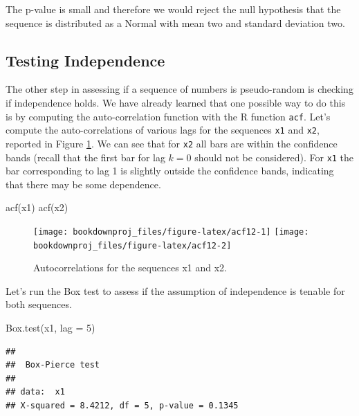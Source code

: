 \documentclass[
]{book}
\newenvironment{Shaded}{\begin{snugshade}}{\end{snugshade}}
\newcommand{\AttributeTok}[1]{\textcolor[rgb]{0.77,0.63,0.00}{#1}}
\newcommand{\DecValTok}[1]{\textcolor[rgb]{0.00,0.00,0.81}{#1}}
\newcommand{\FunctionTok}[1]{\textcolor[rgb]{0.00,0.00,0.00}{#1}}
\newcommand{\NormalTok}[1]{#1}
\begin{document}
The p-value is small and therefore we would reject the null hypothesis that the sequence is distributed as a Normal with mean two and standard deviation two.

\hypertarget{testing-independence-1}{%
\subsection{Testing Independence}\label{testing-independence-1}}

The other step in assessing if a sequence of numbers is pseudo-random is checking if independence holds. We have already learned that one possible way to do this is by computing the auto-correlation function with the R function \texttt{acf}. Let's compute the auto-correlations of various lags for the sequences \texttt{x1} and \texttt{x2}, reported in Figure \ref{fig:acf12}. We can see that for \texttt{x2} all bars are within the confidence bands (recall that the first bar for lag \(k=0\) should not be considered). For \texttt{x1} the bar corresponding to lag 1 is slightly outside the confidence bands, indicating that there may be some dependence.

\begin{Shaded}
\begin{Highlighting}[]
\FunctionTok{acf}\NormalTok{(x1)}
\FunctionTok{acf}\NormalTok{(x2)}
\end{Highlighting}
\end{Shaded}

\begin{figure}

{\centering \texttt{[image: bookdownproj\_files/figure-latex/acf12-1]} \texttt{[image: bookdownproj\_files/figure-latex/acf12-2]} 

}

\caption{Autocorrelations for the sequences x1 and x2.}\label{fig:acf12}
\end{figure}

Let's run the Box test to assess if the assumption of independence is tenable for both sequences.

\begin{Shaded}
\begin{Highlighting}[]
\FunctionTok{Box.test}\NormalTok{(x1, }\AttributeTok{lag =} \DecValTok{5}\NormalTok{)}
\end{Highlighting}
\end{Shaded}

\begin{verbatim}
## 
##  Box-Pierce test
## 
## data:  x1
## X-squared = 8.4212, df = 5, p-value = 0.1345
\end{verbatim}
\end{document}
